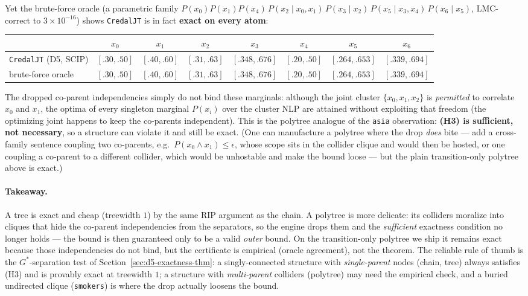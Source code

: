 \documentclass[11pt]{article}
\begin{document}
Yet the brute-force oracle (a parametric family $P(x_0)P(x_1)P(x_4)\,P(x_2\mid x_0,x_1)\,P(x_3\mid
x_2)\,P(x_5\mid x_3,x_4)\,P(x_6\mid x_5)$, LMC-correct to $3\!\times\!10^{-16}$) shows
\texttt{CredalJT} is in fact \textbf{exact on every atom}:
\begin{center}\small
\begin{tabular}{lccccccc}
  \toprule
  & $x_0$ & $x_1$ & $x_2$ & $x_3$ & $x_4$ & $x_5$ & $x_6$ \\
  \midrule
  \texttt{CredalJT} (D5, SCIP) & $[.30,.50]$ & $[.40,.60]$ & $[.31,.63]$ & $[.348,.676]$ & $[.20,.50]$ & $[.264,.653]$ & $[.339,.694]$ \\
  brute-force oracle           & $[.30,.50]$ & $[.40,.60]$ & $[.31,.63]$ & $[.348,.676]$ & $[.20,.50]$ & $[.264,.653]$ & $[.339,.694]$ \\
  \bottomrule
\end{tabular}
\end{center}
The dropped co-parent independencies simply do not bind these marginals: although the joint cluster
$\{x_0,x_1,x_2\}$ is \emph{permitted} to correlate $x_0$ and $x_1$, the optima of every singleton
marginal $P(x_i)$ over the cluster NLP are attained without exploiting that freedom (the optimizing
joint happens to keep the co-parents independent). This is the polytree analogue of the \texttt{asia}
observation: \textbf{(H3) is sufficient, not necessary}, so a structure can violate it and still be
exact. (One can manufacture a polytree where the drop \emph{does} bite --- add a cross-family sentence
coupling two co-parents, e.g.\ $P(x_0\land x_1)\le\epsilon$, whose scope sits in the collider clique
and would then be hosted, or one coupling a co-parent to a different collider, which would be
unhostable and make the bound loose --- but the plain transition-only polytree above is exact.)

\paragraph{Takeaway.} A tree is exact and cheap (treewidth $1$) by the same RIP argument as the chain.
A polytree is more delicate: its colliders moralize into cliques that hide the co-parent
independencies from the separators, so the engine drops them and the \emph{sufficient} exactness
condition no longer holds --- the bound is then guaranteed only to be a valid \emph{outer} bound. On
the transition-only polytree we ship it remains exact because those independencies do not bind, but
the certificate is empirical (oracle agreement), not the theorem. The reliable rule of thumb is the
$G^\ast$-separation test of Section~\ref{sec:d5-exactness-thm}: a singly-connected structure with
\emph{single-parent} nodes (chain, tree) always satisfies (H3) and is provably exact at treewidth
$1$; a structure with \emph{multi-parent} colliders (polytree) may need the empirical check, and a
buried undirected clique (\texttt{smokers}) is where the drop actually loosens the bound.
\end{document}
